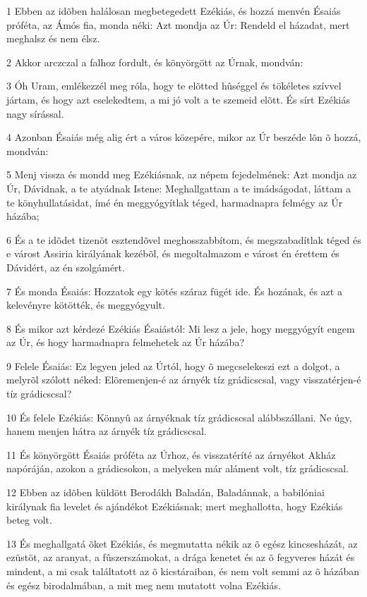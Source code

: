 \par 1 Ebben az idõben halálosan megbetegedett Ezékiás, és hozzá menvén Ésaiás próféta, az Ámós fia, monda néki: Azt mondja az Úr: Rendeld el házadat, mert meghalsz és nem élsz.
\par 2 Akkor arczczal a falhoz fordult, és könyörgött az Úrnak, mondván:
\par 3 Óh Uram, emlékezzél meg róla, hogy te elõtted hûséggel és tökéletes szívvel jártam, és hogy azt cselekedtem, a mi jó volt a te szemeid elõtt. És sírt Ezékiás nagy sírással.
\par 4 Azonban Ésaiás még alig ért a város közepére, mikor az Úr beszéde lõn õ hozzá, mondván:
\par 5 Menj vissza és mondd meg Ezékiásnak, az népem fejedelmének: Azt mondja az Úr, Dávidnak, a te atyádnak Istene: Meghallgattam a te imádságodat, láttam a te könyhullatásidat, ímé én meggyógyítlak téged, harmadnapra felmégy az Úr házába;
\par 6 És a te idõdet tizenöt esztendõvel meghosszabbítom, és megszabadítlak téged és e várost Assiria királyának kezébõl, és megoltalmazom e várost én érettem és Dávidért, az én szolgámért.
\par 7 És monda Ésaiás: Hozzatok egy kötés száraz fügét ide. És hozának, és azt a kelevényre kötötték, és meggyógyult.
\par 8 És mikor azt kérdezé Ezékiás Ésaiástól: Mi lesz a jele, hogy meggyógyít engem az Úr, és hogy harmadnapra felmehetek az Úr házába?
\par 9 Felele Ésaiás: Ez legyen jeled az Úrtól, hogy õ megcselekeszi ezt a dolgot, a melyrõl szólott néked: Elõremenjen-é az árnyék tíz grádicscsal, vagy visszatérjen-é tíz grádicscsal?
\par 10 És felele Ezékiás: Könnyû az árnyéknak tíz grádicscsal alábbszállani. Ne úgy, hanem menjen hátra az árnyék tíz grádicscsal.
\par 11 És könyörgött Ésaiás próféta az Úrhoz, és visszatéríté az árnyékot Akház napóráján, azokon a grádicsokon, a melyeken már aláment volt, tíz grádicscsal.
\par 12 Ebben az idõben küldött Berodákh Baladán, Baladánnak, a babilóniai királynak fia levelet és ajándékot Ezékiásnak; mert meghallotta, hogy Ezékiás beteg volt.
\par 13 És meghallgatá õket Ezékiás, és megmutatta nékik az õ egész kincsesházát, az ezüstöt, az aranyat, a fûszerszámokat, a drága kenetet és az õ fegyveres házát és mindent, a mi csak találtatott az õ kicstáraiban, és nem volt semmi az õ házában és egész birodalmában, a mit meg nem mutatott volna Ezékiás.
